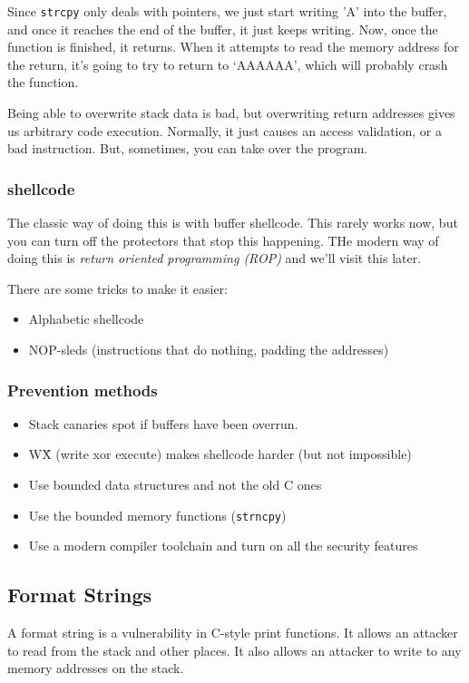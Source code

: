 \documentclass[11pt,a4paper,titlepage,dvipsnames,cmyk]{scrartcl}
\begin{document}
Since \texttt{strcpy} only deals with pointers, we just start writing 'A' into the buffer, and once it reaches the end of the buffer, it just keeps writing. Now, once the function is finished, it returns. When it attempts to read the memory address for the return, it's going to try to return to `AAAAAA', which will probably crash the function.

Being able to overwrite stack data is bad, but overwriting return addresses gives us arbitrary code execution. Normally, it just causes an access validation, or a bad instruction. But, sometimes, you can take over the program.

\subsubsection{shellcode}
The classic way of doing this is with buffer shellcode. This rarely works now, but you can turn off the protectors that stop this happening. THe modern way of doing this is \textit{return oriented programming (ROP)} and we'll visit this later.

There are some tricks to make it easier:
\begin{itemize}
    \item Alphabetic shellcode
    \item NOP-sleds (instructions that do nothing, padding the addresses)
\end{itemize}

\subsubsection{Prevention methods}
\begin{itemize}
    \item Stack canaries spot if buffers have been overrun.
    \item W\^X (write xor execute) makes shellcode harder (but not impossible)
    \item Use bounded data structures and not the old C ones
    \item Use the bounded memory functions (\texttt{strncpy})
    \item Use a modern compiler toolchain and turn on all the security features
\end{itemize}

\subsection{Format Strings}
A format string is a vulnerability in C-style print functions. It allows an attacker to read from the stack and other places. It also allows an attacker to write to any memory addresses on the stack.
\end{document}
